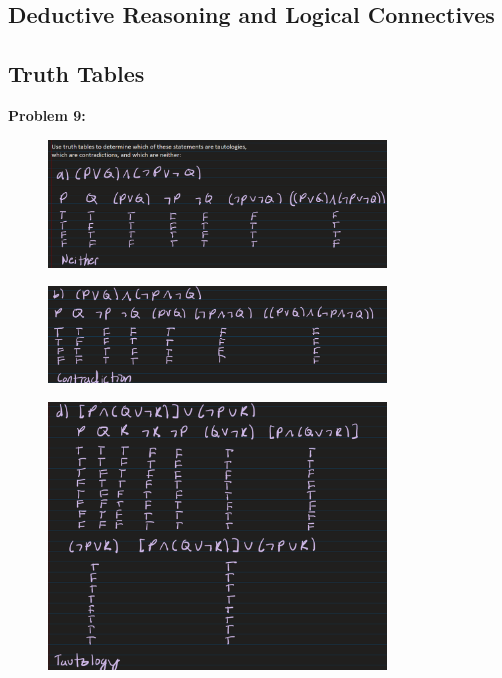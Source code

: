 \subsection{Deductive Reasoning and Logical Connectives}


\subsection{Truth Tables}


\textbf{Problem 9:}
\begin{figure}[H]
    \centering
    \includegraphics[width=0.8\textwidth]{images/1.2/1.PNG}
\end{figure}
\begin{figure}[H]
    \centering
    \includegraphics[width=0.8\textwidth]{images/1.2/2.PNG}
\end{figure}
\begin{figure}[H]
    \centering
    \includegraphics[width=0.8\textwidth]{images/1.2/3.PNG}
\end{figure}

